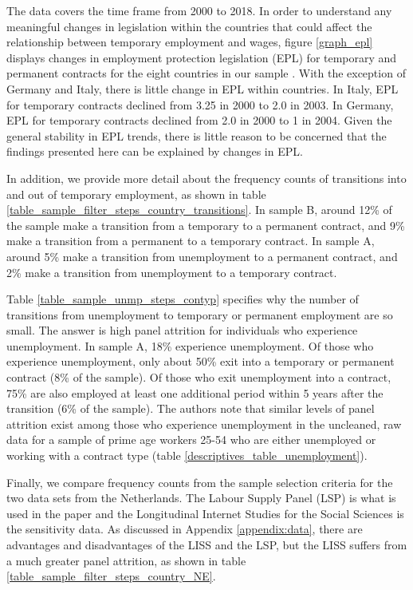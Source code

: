 The data covers the time frame from 2000 to 2018.  In order to understand any meaningful changes in legislation within the countries that could affect the relationship between temporary employment and wages, figure \ref{graph_epl} displays changes in employment protection legislation (EPL) for temporary and permanent contracts for the eight countries in our sample \citep[Ch. 3]{oecd2020recent}.  With the exception of Germany and Italy, there is little change in EPL within countries.  In Italy, EPL for temporary contracts declined from 3.25 in 2000 to 2.0 in 2003.  In Germany, EPL for temporary contracts declined from 2.0 in 2000 to 1 in 2004.  Given the general stability in EPL trends, there is little reason to be concerned that the findings presented here can be explained by changes in EPL.

In addition, we provide more detail about the frequency counts of transitions into and out of temporary employment, as shown in table \ref{table_sample_filter_steps_country_transitions}.  In sample B, around 12\% of the sample make a transition from a temporary to a permanent contract, and 9\% make a transition from a permanent to a temporary contract.  In sample A, around 5\% make a transition from unemployment to a permanent contract, and 2\% make a transition from unemployment to a temporary contract. 

Table \ref{table_sample_unmp_steps_contyp} specifies why the number of transitions from unemployment to temporary or permanent employment are so small.  The answer is high panel attrition for individuals who experience unemployment.  In sample A, 18\% experience unemployment.  Of those who experience unemployment, only about 50\% exit into a temporary or permanent contract (8\% of the sample).  Of those who exit unemployment into a contract, 75\% are also employed at least one additional period within 5 years after the transition (6\% of the sample).  The authors note that similar levels of panel attrition exist among those who experience unemployment in the uncleaned, raw data for a sample of prime age workers 25-54 who are either unemployed or working with a contract type (table \ref{descriptives_table_unemployment}).  

Finally, we compare frequency counts from the sample selection criteria for the two data sets from the Netherlands.  The Labour Supply Panel (LSP) is what is used in the paper and the Longitudinal Internet Studies for the Social Sciences is the sensitivity data.  As discussed in Appendix \ref{appendix:data}, there are advantages and disadvantages of the LISS and the LSP, but the LISS suffers from a much greater panel attrition, as shown in table \ref{table_sample_filter_steps_country_NE}.


